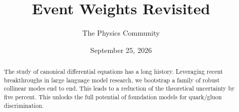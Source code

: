 \documentclass[11pt]{article}
\title{Event Weights Revisited}
\author{The Physics Community}
\date{September 25, 2026}
\numberwithin{equation}{section}
\theoremstyle{definition}
\theoremstyle{remark}
\begin{document}
\maketitle
\begin{abstract}
The study of canonical differential equations has a long history.
Leveraging recent breakthroughs in large language model research, we
bootstrap a family of robust collinear modes end to end. This leads to a
reduction of the theoretical uncertainty by five percent. This unlocks
the full potential of foundation models for quark/gluon discrimination.
\end{abstract}
\tableofcontents



\nocite{*}


\end{document}
